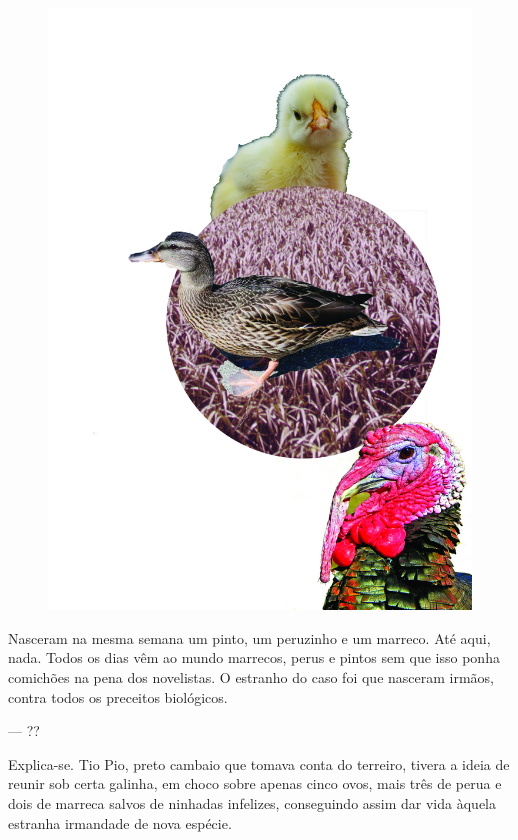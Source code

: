 \pagebreak
\thispagestyle{empty}
\begin{figure}
\includegraphics[width=\textwidth]{./ilustracoes/16_TRAGEDIA.jpg}
\end{figure}
\pagebreak


\noindent{}Nasceram na mesma semana um pinto, um peruzinho e um marreco. Até aqui,
nada. Todos os dias vêm ao mundo marrecos, perus e pintos sem que isso
ponha comichões na pena dos novelistas. O estranho do caso foi que
nasceram irmãos, contra todos os preceitos biológicos.

--- ??

Explica-se. Tio Pio, preto cambaio que tomava conta do terreiro, tivera
a ideia de reunir sob certa galinha, em choco sobre apenas cinco ovos,
mais três de perua e dois de marreca salvos de ninhadas infelizes,
conseguindo assim dar vida àquela estranha irmandade de nova espécie.

